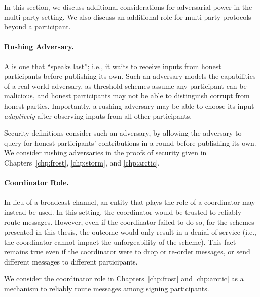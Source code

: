 In this section,
we discuss additional considerations for adversarial power in the multi-party setting.
We also discuss an additional role for multi-party protocols beyond a participant.

\paragraph{Rushing Adversary.}
A  is one that ``speaks last'';
i.e., it waits to receive inputs from honest participants before publishing its own.
Such an adversary models the capabilities of a real-world adversary,
as threshold schemes assume any participant can be malicious,
and honest participants may not be able to distinguish corrupt from honest parties.
Importantly, a rushing adversary may be able to choose its input \emph{adaptively} after observing inputs from all other participants.

Security definitions consider such an adversary,
by allowing the adversary to query for honest participants' contributions in a round before publishing its own.
We consider rushing adversaries in the proofs of security given in Chapters~\ref{chp:frost}, \ref{chp:storm}, and \ref{chp:arctic}.

\paragraph{Coordinator Role.}
In lieu of a broadcast channel,
an entity that plays the role of a coordinator may instead be used.
In this setting,
the coordinator would be trusted to reliably route messages.
However,
even if the coordinator failed to do so,
for the schemes presented in this thesis,
the outcome would only result in a denial of service (i.e., the coordinator cannot impact the unforgeability of the scheme).
This fact remains true even if the coordinator were to drop or re-order messages,
or send different messages to different participants.

We consider the coordinator role in Chapters~\ref{chp:frost} and \ref{chp:arctic} as a mechanism to reliably route messages among signing participants.
